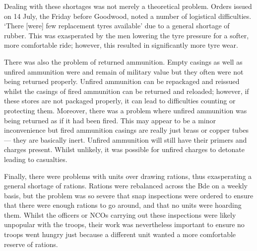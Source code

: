 \documentclass[noraggedright]{turabian-researchpaper}
\begin{document}
Dealing with these shortages was not merely a theoretical problem.  Orders 
issued on 14 July, the Friday before Goodwood, noted a number of logistical 
difficulties.  `There [were] few replacement tyres available' due to a general
shortage of rubber.\autocite[27 Armd Bde Adm Order No. 9 14 July 1944][para 6]
{27wd}
This was exasperated by the men lowering the tyre pressure for a softer, more 
comfortable ride; however, this resulted in significantly more tyre wear.  %

There was also the problem of returned ammunition.  Empty casings as well 
as unfired ammunition were and remain of military value but they often were 
not being returned properly.  Unfired ammunition can be repackaged and 
reissued whilst the casings of fired ammunition can be returned and reloaded; 
however, if these stores are not packaged properly, it can lead to 
difficulties counting or protecting them.  Moreover, there was a problem 
where unfired ammunition was being returned as if it had been fired.  This 
may appear to be a minor inconvenience but fired ammunition casings are 
really just brass or copper tubes ---  they are basically inert.  Unfired 
ammunition will still have their primers and charges present.  Whilst unlikely,
it was possible for unfired charges to detonate leading to 
casualties.\autocite[27 Armd Bde Adm Order No. 9 14 July 1944][para 10]{27wd}

Finally, there were problems with units over drawing rations, thus 
exasperating a general shortage of rations.  Rations were rebalanced across
the Bde on a weekly basis, but the problem was so severe that snap 
inspections were ordered to ensure that there were enough rations to go 
around, and that no units were hoarding them.\autocite[27 Armd Bde Adm Order 
No. 9 14 July 1944][para 12]{27wd}  Whilst the officers or NCOs carrying out 
these inspections were likely unpopular with the troops, their work was 
nevertheless important to ensure no troops went hungry just because a 
different unit wanted a more comfortable reserve of rations.
\end{document}
